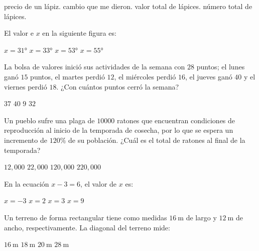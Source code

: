 \documentclass[12pt, letter]{exam}
\begin{document}
\begin{multicols}{2}
\begin{questions}
\begin{choices}
        \choice precio de un lápiz.
        \choice cambio que me dieron.
        \choice valor total de lápices.
        \choice número total de lápices.
    \end{choices}
    \answerline
    \question El valor e $x$ en la siguiente figura es:
    \begin{figure}[H]
        \centering
    \end{figure}
    \begin{choices}
        \choice $x = \ang{31}$
        \choice $x = \ang{33}$
        \choice $x = \ang{53}$
        \choice $x = \ang{55}$
    \end{choices}
    \answerline
    \question La bolsa de valores inició sus actividades de la semana con $28$ puntos; el lunes ganó $15$ puntos, el martes perdió $12$, el miércoles perdió $16$, el jueves ganó $40$ y el viernes perdió $18$. ¿Con cuántos puntos cerró la semana?
    \begin{choices}
        \choice $37$
        \choice $40$
        \choice $9$
        \choice $32$
    \end{choices}
    \answerline
    \question Un pueblo sufre una plaga de $10 000$ ratones que encuentran condiciones de reproducción al inicio de la temporada de cosecha, por lo que se espera un incremento de $120\%$ de su población. ¿Cuál es el total de ratones al final de la temporada?
    \begin{choices}
        \choice $12,000$
        \choice $22,000$
        \choice $120,000$
        \choice $220,000$
    \end{choices}
    \answerline
    \question En la ecuación $x - 3 = 6$, el valor de $x$ es:
    \begin{choices}
        \choice $x = -3$
        \choice $x = 2$
        \choice $x = 3$
        \choice $x = 9$
    \end{choices}
    \answerline
    \question Un terreno de forma rectangular tiene como medidas $\SI{16}{\meter}$ de largo y $\SI{12}{\meter}$ de ancho, respectivamente. La diagonal del terreno mide:
    \begin{choices}
        \choice $\SI{16}{\meter}$
        \choice $\SI{18}{\meter}$
        \choice $\SI{20}{\meter}$
        \choice $\SI{28}{\meter}$
    \end{choices}
    \answerline
\end{questions}
\end{multicols}
\end{document}
